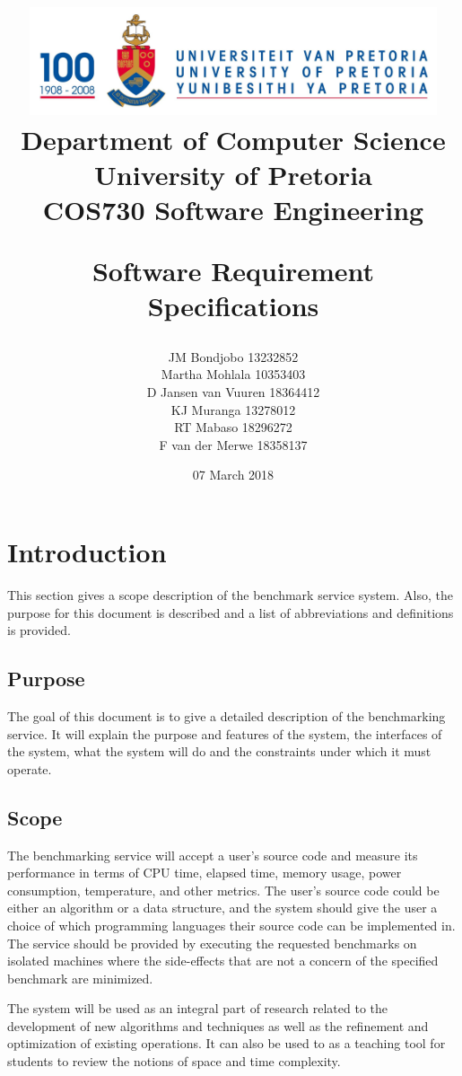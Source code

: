 \documentclass[a4paper,12pt]{article}
\title{\includegraphics[width=12cm]{Eeufeeslogo.jpg} \\
       Department of Computer Science \\
       University of Pretoria \\
       \vspace{0.5cm}
       COS730 Software Engineering \\
       \vspace{0.5cm}
       \begin{large} \textbf{Software Requirement Specifications}\end{large}}
\date{07 March 2018}
\author{	JM Bondjobo		13232852 \\
		Martha Mohlala		10353403\\
		D Jansen van Vuuren	18364412\\
		 KJ Muranga         13278012        \\
		 RT Mabaso          18296272 \\
         F van der Merwe 18358137
}
\begin{document}
\maketitle
\thispagestyle{empty}
\clearpage

\newpage
{}
\thispagestyle{empty}
\tableofcontents
\clearpage

\newpage
{}

\section {Introduction}
This section gives a scope description of the benchmark service system. Also, the purpose for this document is described and a list of abbreviations and definitions is provided.
\subsection{Purpose}
The goal of this document is to give a detailed description of the  benchmarking service. It will explain the purpose and features of the system, the interfaces of the system, what the system will do and the constraints under which it must operate.


\subsection{Scope}
The benchmarking service will accept a user's source code and measure its performance in terms of CPU time, elapsed time, memory usage, power consumption, temperature, and other metrics. The user's source code could be either an algorithm or a data structure, and the system should give the user a choice of which programming languages their source code can be implemented in. The service should be provided by executing the requested benchmarks on isolated machines where the side-effects that are not a concern of the specified benchmark are minimized.

The system will be used as an integral part of research related to the development of new algorithms and techniques as well as the refinement and optimization of existing operations. It can also be used to as a teaching tool for students to review the notions of space and time complexity.
\end{document}
